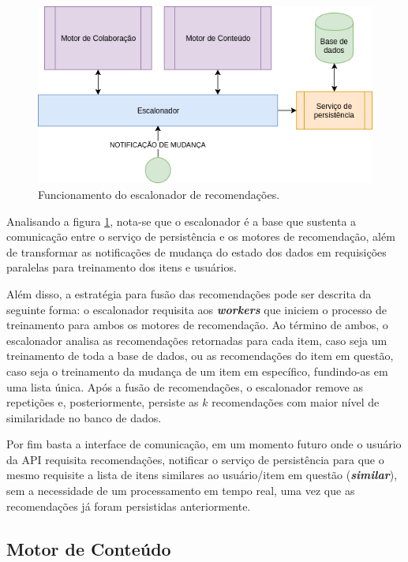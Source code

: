 \documentclass[12pt, openright, oneside, a4paper, brazil]{abntex2}
\begin{document}
\begin{figure}[h!tp]
	\caption{\label{scheduler}Funcionamento do escalonador de recomendações.}
	\begin{center}
		\includegraphics[scale=0.8]{images/scheduler.png}
	\end{center}
	\hspace{5.5cm}{Fonte: O Autor.}
\end{figure}

Analisando a figura \ref{scheduler}, nota-se que o escalonador é a base que sustenta a comunicação entre o serviço de persistência e os motores de recomendação, além de transformar as notificações de mudança do estado dos dados em requisições paralelas para treinamento dos itens e usuários.

Além disso, a estratégia para fusão das recomendações pode ser descrita da seguinte forma: o escalonador requisita aos \textbf{\textit{workers}} que iniciem o processo de treinamento para ambos os motores de recomendação. Ao término de ambos, o escalonador analisa as recomendações retornadas para cada item, caso seja um treinamento de toda a base de dados, ou as recomendações do item em questão, caso seja o treinamento da mudança de um item em específico, fundindo-as em uma lista única. Após a fusão de recomendações, o escalonador remove as repetições e, posteriormente, persiste as $k$ recomendações com maior nível de similaridade no banco de dados.

Por fim basta a interface de comunicação, em um momento futuro onde o usuário da API requisita recomendações, notificar o serviço de persistência para que o mesmo requisite a lista de itens similares ao usuário/item em questão (\textbf{\textit{similar}}), sem a necessidade de um processamento em tempo real, uma vez que as recomendações já foram persistidas anteriormente.

\subsection{Motor de Conteúdo} \label{motor:conteudo}
\end{document}
